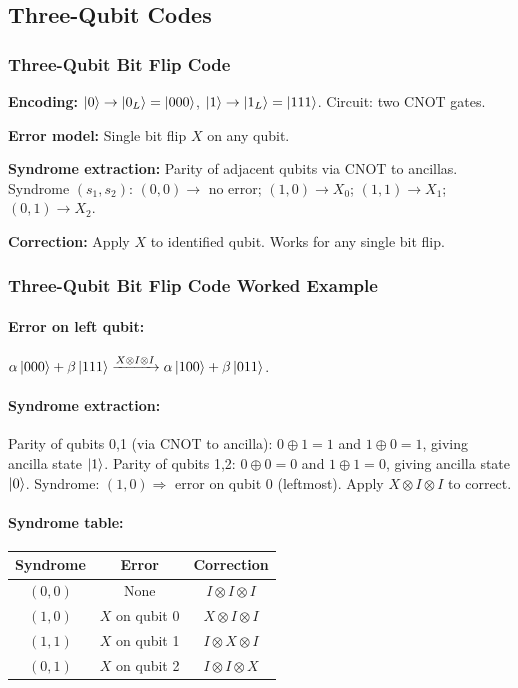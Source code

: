 \documentclass[10pt,a4paper]{article}
\begin{document}
\subsection{Three-Qubit Codes}

\subsubsection*{Three-Qubit Bit Flip Code}

\begin{tcolorbox}[algostyle, title={Algorithm: 3-Qubit Bit Flip Code}]
\textbf{Encoding:} $\ket{0}\to\ket{0_L}=\ket{000}$, $\ket{1}\to\ket{1_L}=\ket{111}$. Circuit: two CNOT gates.

\textbf{Error model:} Single bit flip $X$ on any qubit.

\textbf{Syndrome extraction:} Parity of adjacent qubits via CNOT to ancillas.
Syndrome $(s_1,s_2)$: $(0,0)\to$ no error; $(1,0)\to X_0$; $(1,1)\to X_1$; $(0,1)\to X_2$.

\textbf{Correction:} Apply $X$ to identified qubit. Works for any single bit flip.
\end{tcolorbox}

\subsubsection*{Three-Qubit Bit Flip Code Worked Example}

\paragraph{Error on left qubit:} $\alpha\ket{000}+\beta\ket{111}\xrightarrow{X\otimes I\otimes I}\alpha\ket{100}+\beta\ket{011}$.

\paragraph{Syndrome extraction:}
Parity of qubits 0,1 (via CNOT to ancilla): $0\oplus 1=1$ and $1\oplus 0=1$, giving ancilla state $\ket{1}$.
Parity of qubits 1,2: $0\oplus 0=0$ and $1\oplus 1=0$, giving ancilla state $\ket{0}$.
Syndrome: $(1,0)\Rightarrow$ error on qubit 0 (leftmost). Apply $X\otimes I\otimes I$ to correct.

\paragraph{Syndrome table:}
\begin{center}
\begin{tabular}{ccc}
Syndrome & Error & Correction \\
\hline
$(0,0)$ & None & $I\otimes I\otimes I$ \\
$(1,0)$ & $X$ on qubit 0 & $X\otimes I\otimes I$ \\
$(1,1)$ & $X$ on qubit 1 & $I\otimes X\otimes I$ \\
$(0,1)$ & $X$ on qubit 2 & $I\otimes I\otimes X$ \\
\end{tabular}
\end{center}
\end{document}
